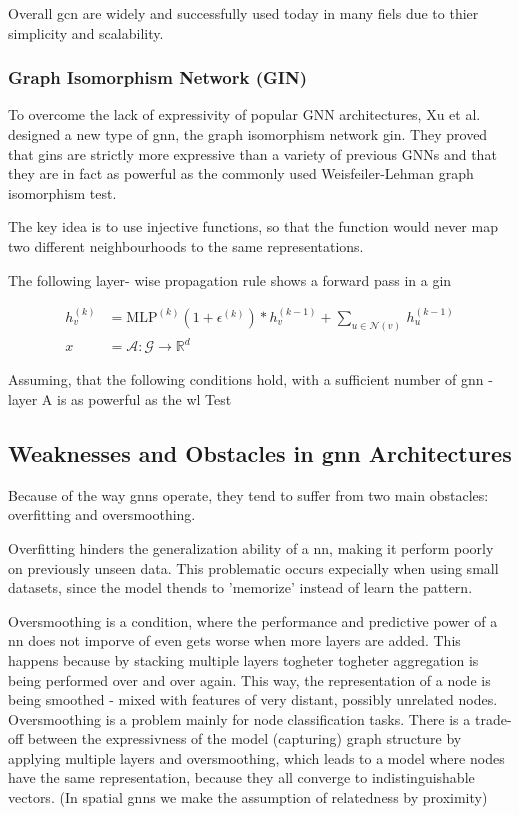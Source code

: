 Overall \acf{gcn} are widely and successfully used today in many fiels due to thier simplicity
and scalability.

\subsubsection{Graph Isomorphism Network (GIN)}
\label{sec:related:architectures:gin}
To overcome the lack of expressivity of popular GNN architectures,
Xu et al. designed a new type of \ac{gnn}, the graph isomorphism network \ac{gin}. They proved that
\acp{gin} are strictly more expressive than a variety of previous GNNs and that they are in fact
as powerful as the commonly used Weisfeiler-Lehman graph isomorphism test.

The key idea is to use injective functions, so that the function would never map two different
neighbourhoods to the same representations. \cite{Xu2019}

The following layer- wise propagation rule shows a forward pass in a \ac{gin}

\begin{align*}
    h^{(k)}_{v} & = \mathrm{MLP}^{(k)} (1 + \epsilon^{(k)}) *h^{(k-1)}_{v} + \sum_{{u} \in{\mathcal{N}(v)}} \,h^{(k-1)}_{u} \\
    x           & = \mathcal{A}: \mathcal{G} \rightarrow\mathbb{R}^{d}
\end{align*}

Assuming, that the following conditions hold, with a sufficient number
of \ac{gnn} - layer A is as powerful as the \ac{wl} Test

\subsection{Weaknesses and Obstacles in \ac{gnn} Architectures}
\label{sec:related:pred:typical}
Because of the way \acp{gnn} operate, they tend to suffer from two main obstacles:
overfitting and oversmoothing.

Overfitting hinders the generalization ability of a \acf{nn}, making it perform poorly
on previously unseen data. This problematic occurs expecially when using small datasets,
since the model thends to 'memorize' instead of learn the pattern.


Oversmoothing is a condition, where the performance and predictive power of a \ac{nn}
does not imporve of even gets worse when more layers are added. This happens because
by stacking multiple layers  togheter togheter aggregation is being performed over and over again.
This way, the representation of a node is being smoothed - mixed with features of
very distant, possibly unrelated nodes. Oversmoothing is a problem mainly for node classification
tasks. There is a trade-off between the expressivness of the model (capturing) graph structure by
applying multiple layers and oversmoothing, which leads to a model where nodes have the same representation,
because they all converge to indistinguishable vectors.\cite{Zhou2020}\cite{DBLP:journals/corr/abs-2006-04064}
(In spatial \acp{gnn} we make the assumption of relatedness by proximity)


